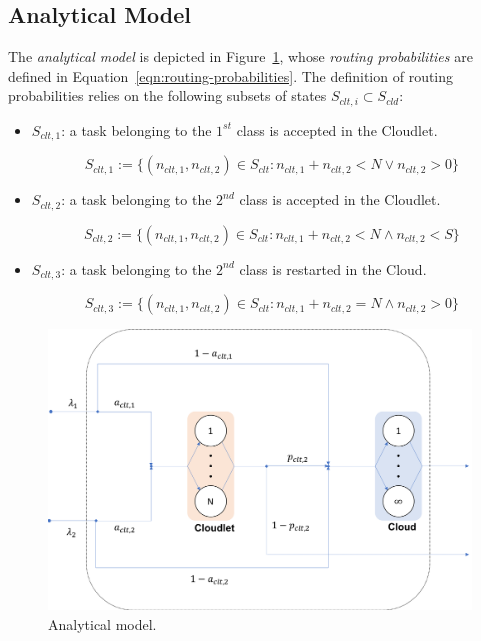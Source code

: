 \subsection{Analytical Model}
The \textit{analytical model} is depicted in Figure~\ref{fig:analytical-model}, whose \textit{routing probabilities} are defined in Equation~\ref{eqn:routing-probabilities}.
The definition of routing probabilities relies on the following subsets of states $S_{clt,i} \subset S_{cld}$:

\begin{itemize}
	\item $S_{clt,1}$:  a task belonging to the $1^{st}$ class is accepted in the Cloudlet.
	
	\begin{equation}
	S_{clt,1} := \{(n_{clt,1},n_{clt,2})\in S_{clt} : n_{clt,1}+n_{clt,2}<N \vee n_{clt,2}>0\}
	\end{equation}
	
	\item $S_{clt,2}$: a task belonging to the $2^{nd}$ class is accepted in the Cloudlet.
	
	\begin{equation}
	S_{clt,2} := \{(n_{clt,1},n_{clt,2})\in S_{clt} : n_{clt,1}+n_{clt,2}<N \wedge n_{clt,2}<S\}
	\end{equation}
	
	\item $S_{clt,3}$: a task belonging to the $2^{nd}$ class is restarted in the Cloud.
	
	\begin{equation}
	S_{clt,3} := \{(n_{clt,1},n_{clt,2})\in S_{clt} : n_{clt,1}+n_{clt,2}=N \wedge n_{clt,2}>0\}
	\end{equation}
\end{itemize}

\begin{figure}
	\includegraphics[width=\columnwidth]{fig/analytical-model}
	\caption{Analytical model.}
	\label{fig:analytical-model}
\end{figure}

